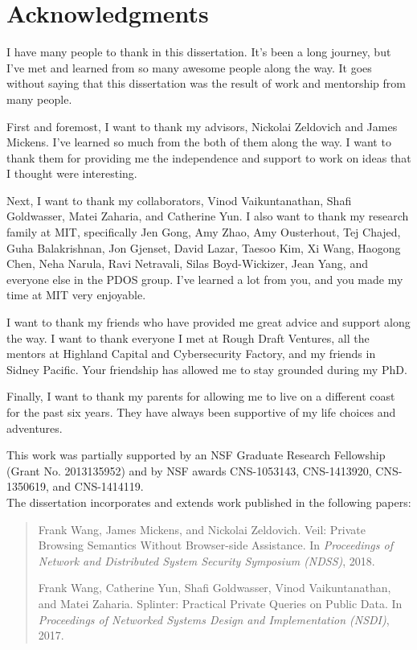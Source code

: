 \chapter*{Acknowledgments}

I have many people to thank in this dissertation. It's been a long journey,
but I've met and learned from so many awesome people along the way. It goes without
saying that this dissertation was the result of work and mentorship from many people.

First and foremost,
I want to thank my advisors, Nickolai Zeldovich and James Mickens. I've learned so much
from the both of them along the way. I want to thank them for providing me
the independence and support to work on ideas that I thought were interesting.

Next, I want to thank my collaborators, Vinod Vaikuntanathan, Shafi Goldwasser,
Matei Zaharia, and Catherine Yun. I also want to thank my research family at MIT,
specifically Jen Gong, Amy Zhao, Amy Ousterhout, Tej Chajed, Guha Balakrishnan,
Jon Gjenset, David Lazar, Taesoo Kim, Xi Wang, Haogong Chen, Neha Narula, Ravi Netravali, Silas Boyd-Wickizer,
Jean Yang, and everyone else in the PDOS group. I've learned a lot from you, and you
made my time at MIT very enjoyable.

I want to thank my friends who have provided me great advice and support along the way.
I want to thank everyone I met at Rough Draft Ventures, all the mentors at
Highland Capital and Cybersecurity Factory, and my friends in Sidney Pacific. Your
friendship has allowed me to stay grounded during my PhD. 

Finally, I want to thank my parents for allowing me to live on a different
coast for the past six years. They have always been supportive of my life choices
and adventures.

\asterism


This work was
partially supported by an NSF Graduate Research Fellowship
(Grant No. 2013135952) and by NSF awards
CNS-1053143, CNS-1413920, CNS-1350619, 
and CNS-1414119. \\

The dissertation incorporates and extends work published
in the following papers:

\begin{quote}

  Frank Wang, James Mickens, and Nickolai Zeldovich.
  \newblock Veil: Private Browsing Semantics Without Browser-side Assistance.
  \newblock In \emph{Proceedings of Network and Distributed System Security Symposium (\mbox{NDSS})},
  2018.
  
  Frank Wang, Catherine Yun, Shafi Goldwasser, Vinod Vaikuntanathan, and Matei Zaharia.
  \newblock Splinter: Practical Private Queries on Public Data.
  \newblock In \emph{Proceedings of Networked Systems Design
  	and Implementation (\mbox{NSDI})}, 2017.
  
\end{quote}
